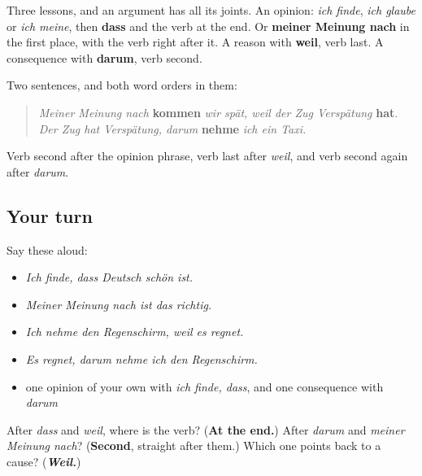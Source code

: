 \begin{grammarlens}[title={What you've built}]
Three lessons, and an argument has all its joints. An opinion: \emph{ich finde}, \emph{ich glaube} or \emph{ich meine}, then \textbf{dass} and the verb at the end. Or \textbf{meiner Meinung nach} in the first place, with the verb right after it. A reason with \textbf{weil}, verb last. A consequence with \textbf{darum}, verb second.

Two sentences, and both word orders in them:

\begin{quote}
\emph{Meiner Meinung nach} \textbf{kommen} \emph{wir spät, weil der Zug Verspätung} \textbf{hat}. \emph{Der Zug hat Verspätung, darum} \textbf{nehme} \emph{ich ein Taxi.}
\end{quote}

Verb second after the opinion phrase, verb last after \emph{weil}, and verb second again after \emph{darum}.
\end{grammarlens}

\subsection*{Your turn}
Say these aloud:

\begin{itemize}
\raggedright
  \item \emph{Ich finde, dass Deutsch schön ist.}
  \item \emph{Meiner Meinung nach ist das richtig.}
  \item \emph{Ich nehme den Regenschirm, weil es regnet.}
  \item \emph{Es regnet, darum nehme ich den Regenschirm.}
  \item one opinion of your own with \emph{ich finde, dass}, and one consequence with \emph{darum}
\end{itemize}

\begin{tcolorbox}[breakable,colback=teal!4,colframe=teal!35!black,title={Before you move on}]
After \emph{dass} and \emph{weil}, where is the verb? (\textbf{At the end.}) After \emph{darum} and \emph{meiner Meinung nach}? (\textbf{Second}, straight after them.) Which one points back to a cause? (\emph{\textbf{Weil.}})
\end{tcolorbox}
